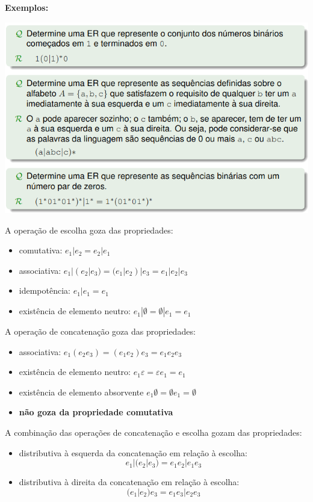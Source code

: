 \documentclass{article}
\begin{document}
\begin{flushleft}
  \textbf{Exemplos:}

  \begin{center}
    \includegraphics[scale=0.4]{2}
  \end{center}

  \item A operação de escolha goza das propriedades:
  \begin{itemize}
    \item comutativa: $e_1 | e_2 = e_2 | e_1$
    \item associativa: $e_1 | (e_2 | e_3) = (e_1 | e_2) | e_3 = e_1 | e_2 | e_3$
    \item idempotência: $e_1 | e_1 = e_1$
    \item existência de elemento neutro: $e_1 | \emptyset = \emptyset | e_1 = e_1$ 
  \end{itemize}

  \item A operação de concatenação goza das propriedades:
  \begin{itemize}
    \item associativa: $e_1  (e_2  e_3) = (e_1  e_2)  e_3 = e_1  e_2  e_3$
    \item existência de elemento neutro: $e_1  \varepsilon = \varepsilon  e_1 = e_1$ 
    \item existência de elemento absorvente $e_1 \emptyset = \emptyset e_1 = \emptyset$
    \item \textbf{não goza da propriedade comutativa}
  \end{itemize}

  \item A combinação das operações de concatenação e escolha gozam das propriedades:
  \begin{itemize}
    \item distributiva à esquerda da concatenação em relação à escolha:
    \[e_1 | (e_2 | e_3) = e_1 e_2 | e_1 e_3\]
    \item distributiva à direita da concatenação em relação à escolha:
    \[(e_1 | e_2) e_3 = e_1 e_3 | e_2 e_3\]
  \end{itemize}


\end{flushleft}
\end{document}
